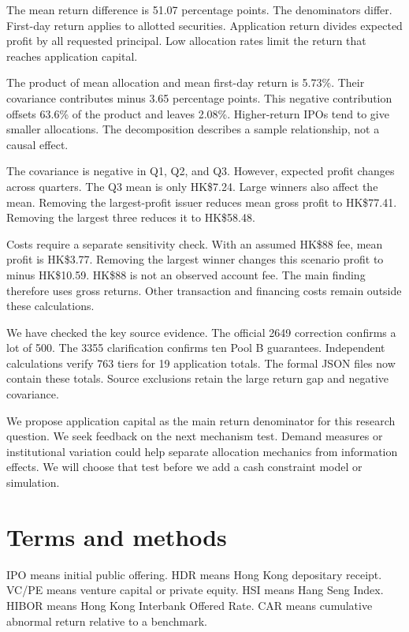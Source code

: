\documentclass[10pt,a4paper]{article}
\begin{document}
The mean return difference is 51.07 percentage points. The denominators differ. First-day return applies to allotted securities. Application return divides expected profit by all requested principal. Low allocation rates limit the return that reaches application capital.


The product of mean allocation and mean first-day return is 5.73\%. Their covariance contributes minus 3.65 percentage points. This negative contribution offsets 63.6\% of the product and leaves 2.08\%. Higher-return IPOs tend to give smaller allocations. The decomposition describes a sample relationship, not a causal effect.


The covariance is negative in Q1, Q2, and Q3. However, expected profit changes across quarters. The Q3 mean is only HK\$7.24. Large winners also affect the mean. Removing the largest-profit issuer reduces mean gross profit to HK\$77.41. Removing the largest three reduces it to HK\$58.48.


Costs require a separate sensitivity check. With an assumed HK\$88 fee, mean profit is HK\$3.77. Removing the largest winner changes this scenario profit to minus HK\$10.59. HK\$88 is not an observed account fee. The main finding therefore uses gross returns. Other transaction and financing costs remain outside these calculations.


We have checked the key source evidence. The official 2649 correction confirms a lot of 500. The 3355 clarification confirms ten Pool B guarantees. Independent calculations verify 763 tiers for 19 application totals. The formal JSON files now contain these totals. Source exclusions retain the large return gap and negative covariance.


We propose application capital as the main return denominator for this research question. We seek feedback on the next mechanism test. Demand measures or institutional variation could help separate allocation mechanics from information effects. We will choose that test before we add a cash constraint model or simulation.


\section*{Terms and methods}
IPO means initial public offering. HDR means Hong Kong depositary receipt. VC/PE means venture capital or private equity. HSI means Hang Seng Index. HIBOR means Hong Kong Interbank Offered Rate. CAR means cumulative abnormal return relative to a benchmark.
\end{document}
